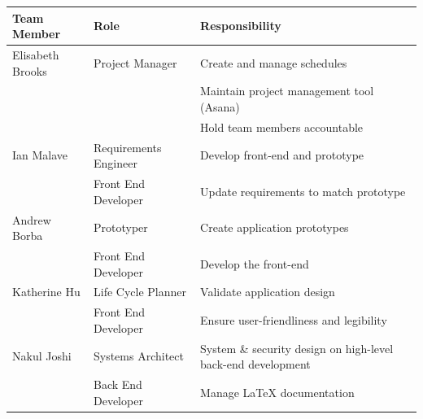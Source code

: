 \clearpage

\begin{table}[h]
\begin{tabularx}{\textwidth}{@{}llX@{}}
\toprule
Team Member                                                 & Role                          & Responsibility                                               \\ \midrule
Elisabeth Brooks                                            & Project Manager               & Create and manage schedules                                  \\
                                                            &                               & Maintain project management tool (Asana)                     \\
                                                            &                               & Hold team members accountable                                \\
Ian Malave                                                  & Requirements Engineer         & Develop front-end and prototype                              \\
                                                            & Front End Developer           & Update requirements to match prototype                       \\
Andrew Borba                                                & Prototyper                    & Create application prototypes                                \\
                                                            & Front End Developer           & Develop the front-end                                        \\
Katherine Hu                                                & Life Cycle Planner            & Validate application design                                  \\
                                                            & Front End Developer           & Ensure user-friendliness and legibility                      \\
Nakul Joshi                                                 & Systems Architect             & System \& security design on high-level back-end development \\
                                                            & Back End Developer            & Manage LaTeX documentation                                   \\

\end{tabularx}
\end{table}
